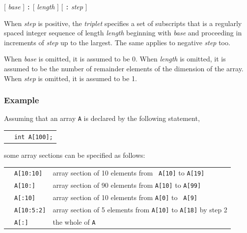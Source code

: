 \begin{center}
  [ {\it base} ] {\tt :}
  [ {\it length} ] [ {\tt :} {\it step} ]
\end{center}

When {\it step} is positive, the {\it triplet} specifies a set of
subscripts that is a regularly spaced integer sequence of length {\it
length} beginning with {\it base} and proceeding in increments of {\it
step} up to the largest.
%
The same applies to negative {\it step} too.

When {\it base} is omitted, it is assumed to be 0. When {\it length}
is omitted, it is assumed to be the number of remainder elements of the
dimension of the array. When {\it step} is omitted, it is assumed to be 1.

\subsubsection*{Example}

Assuming that an array {\tt A} is declared by the following statement,

\vspace{0.3cm}

\begin{tabular}{ll}
\hspace{0.5cm} & {\tt int A[100];} \\
\end{tabular}

\vspace{0.3cm}

\hspace{-0.55cm}some array sections can be specified as follows:

\vspace{0.3cm}

\begin{tabular}{lll}
\hspace{0.5cm} & {\tt A[10:10]} & array section of 10 elements from {\tt
 A[10]} to {\tt A[19]} \\
 & {\tt A[10:]} & array section of 90 elements from
		  {\tt A[10]} to {\tt A[99]}\\
 & {\tt A[:10]} & array section of 10 elements from {\tt A[0]} to {\tt
	 A[9]} \\
 & {\tt A[10:5:2]} & array section of 5 elements from {\tt A[10]} to
	 {\tt A[18]} by step 2 \\
 & {\tt A[:]} & the whole of {\tt A} \\
\end{tabular}


